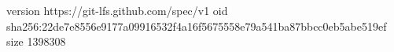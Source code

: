 version https://git-lfs.github.com/spec/v1
oid sha256:22de7e8556e9177a09916532f4a16f5675558e79a541ba87bbcc0eb5abe519ef
size 1398308

